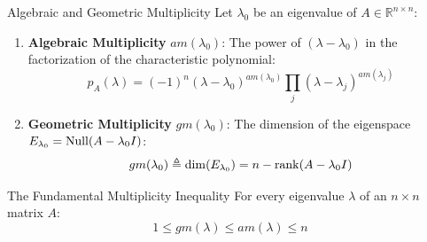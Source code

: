 \begin{definitionbox}{Algebraic and Geometric Multiplicity}
Let $\lambda_0$ be an eigenvalue of $A \in \mathbb{R}^{n \times n}$:
\begin{enumerate}
    \item \textbf{Algebraic Multiplicity} $am(\lambda_0)$: The power of $(\lambda - \lambda_0)$ in the factorization of the characteristic polynomial:
    \begin{equation}
    p_A(\lambda) = (-1)^n (\lambda - \lambda_0)^{am(\lambda_0)} \prod_{j} (\lambda - \lambda_j)^{am(\lambda_j)}
    \end{equation}
    \item \textbf{Geometric Multiplicity} $gm(\lambda_0)$: The dimension of the eigenspace $E_{\lambda_0} = \operatorname{Null}(A - \lambda_0 I)$:
    \begin{equation}
    gm(\lambda_0) \triangleq \dim(E_{\lambda_0}) = n - \operatorname{rank}(A - \lambda_0 I)
    \end{equation}
\end{enumerate}
\end{definitionbox}

\begin{theorembox}{The Fundamental Multiplicity Inequality}
For every eigenvalue $\lambda$ of an $n \times n$ matrix $A$:
\begin{equation}
1 \le gm(\lambda) \le am(\lambda) \le n
\label{eq:mult_inequality}
\end{equation}
\end{theorembox}

